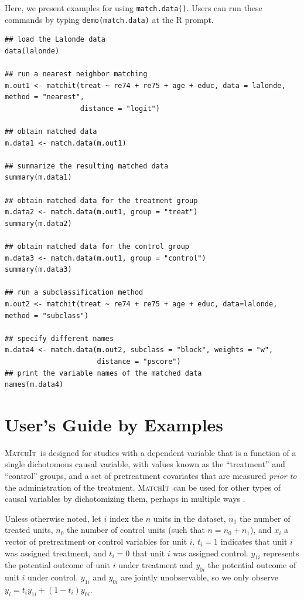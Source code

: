 \documentclass[oneside,letterpaper,titlepage]{article}
\newcommand{\MatchIt}{\textsc{MatchIt}}
\begin{document}
Here, we present examples for using {\tt match.data()}. Users can run
these commands by typing {\tt demo(match.data)} at the R prompt.
\begin{verbatim}
## load the Lalonde data
data(lalonde)

## run a nearest neighbor matching
m.out1 <- matchit(treat ~ re74 + re75 + age + educ, data = lalonde, method = "nearest",  
                  distance = "logit")

## obtain matched data 
m.data1 <- match.data(m.out1)

## summarize the resulting matched data
summary(m.data1)

## obtain matched data for the treatment group
m.data2 <- match.data(m.out1, group = "treat")
summary(m.data2)

## obtain matched data for the control group
m.data3 <- match.data(m.out1, group = "control")
summary(m.data3)

## run a subclassification method
m.out2 <- matchit(treat ~ re74 + re75 + age + educ, data=lalonde, method = "subclass")

## specify different names
m.data4 <- match.data(m.out2, subclass = "block", weights = "w",
                      distance = "pscore")
## print the variable names of the matched data
names(m.data4)
\end{verbatim}

\clearpage
\section{User's Guide by Examples}

\MatchIt\ is designed for studies with a dependent variable that is a
function of a single dichotomous causal variable, with values known as
the ``treatment'' and ``control'' groups, and a set of pretreatment
covariates that are measured {\it prior to} the administration of the
treatment.  \MatchIt\ can be used for other types of causal variables
by dichotomizing them, perhaps in multiple ways \citep[see
also][]{ImaDyk04}.

Unless otherwise noted, let $i$ index the $n$ units in the dataset,
$n_1$ the number of treated units, $n_0$ the number of control units
(such that $n=n_0+n_1$), and $x_i$ a vector of pretreatment or control
variables for unit $i$.  $t_i=1$ indicates that unit $i$ was assigned
treatment, and $t_i=0$ that unit $i$ was assigned control.  $y_{1i}$
represents the potential outcome of unit $i$ under treatment and
$y_{0i}$ the potential outcome of unit $i$ under control.  $y_{1i}$
and $y_{0i}$ are jointly unobservable, so we only observe
$y_i=t_iy_{1i}+(1-t_i)y_{0i}$.
\end{document}
